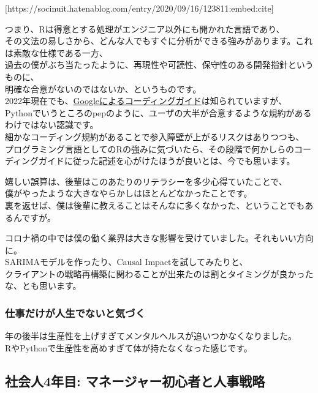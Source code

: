 \documentclass[
  letterpaper,
  DIV=11,
  numbers=noendperiod]{scrartcl}
\begin{document}
{[}https://socinuit.hatenablog.com/entry/2020/09/16/123811:embed:cite{]}

つまり、Rは得意とする処理がエンジニア以外にも開かれた言語であり、\\
その文法の易しさから、どんな人でもすぐに分析ができる強みがあります。これは素敵な仕様である一方、\\
過去の僕がぶち当たったように、再現性や可読性、保守性のある開発指針というものに、\\
明確な合意がないのではないか、というものです。\\
2022年現在でも、\href{https://google.github.io/styleguide/Rguide.html}{Googleによるコーディングガイド}は知られていますが、\\
Pythonでいうところのpepのように、ユーザの大半が合意するような規約があるわけではない認識です。\\
細かなコーディング規約があることで参入障壁が上がるリスクはありつつも、\\
プログラミング言語としてのRの強みに気づいたら、その段階で何かしらのコーディングガイドに従った記述を心がけたほうが良いとは、今でも思います。

嬉しい誤算は、後輩はこのあたりのリテラシーを多少心得ていたことで、\\
僕がやったような大きなやらかしはほとんどなかったことです。\\
裏を返せば、僕は後輩に教えることはそんなに多くなかった、ということでもあるんですが。

コロナ禍の中では僕の働く業界は大きな影響を受けていました。それもいい方向に。\\
SARIMAモデルを作ったり、Causal Impactを試してみたりと、\\
クライアントの戦略再構築に関わることが出来たのは割とタイミングが良かったな、とも思います。

\hypertarget{ux4ed5ux4e8bux3060ux3051ux304cux4ebaux751fux3067ux306aux3044ux3068ux6c17ux3065ux304f}{%
\subsubsection{仕事だけが人生でないと気づく}\label{ux4ed5ux4e8bux3060ux3051ux304cux4ebaux751fux3067ux306aux3044ux3068ux6c17ux3065ux304f}}

年の後半は生産性を上げすぎてメンタルヘルスが追いつかなくなりました。\\
RやPythonで生産性を高めすぎて体が持たなくなった感じです。

\hypertarget{ux793eux4f1aux4eba4ux5e74ux76ee-ux30deux30cdux30fcux30b8ux30e3ux30fcux521dux5fc3ux8005ux3068ux4ebaux4e8bux6226ux7565}{%
\subsection{社会人4年目:
マネージャー初心者と人事戦略}\label{ux793eux4f1aux4eba4ux5e74ux76ee-ux30deux30cdux30fcux30b8ux30e3ux30fcux521dux5fc3ux8005ux3068ux4ebaux4e8bux6226ux7565}}
\end{document}
